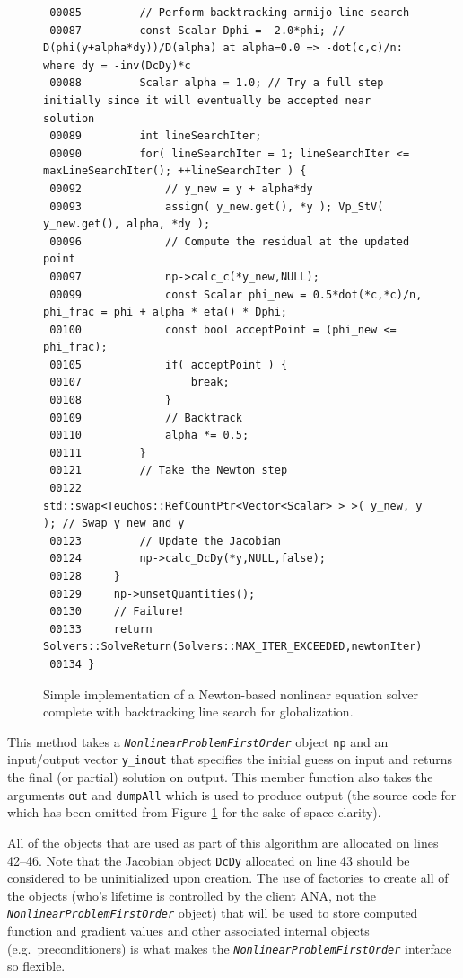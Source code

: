 {\begin{figure}
\begin{minipage}{\textwidth}
{\begin{verbatim}
 00085         // Perform backtracking armijo line search
 00087         const Scalar Dphi = -2.0*phi; // D(phi(y+alpha*dy))/D(alpha) at alpha=0.0 => -dot(c,c)/n: where dy = -inv(DcDy)*c
 00088         Scalar alpha = 1.0; // Try a full step initially since it will eventually be accepted near solution
 00089         int lineSearchIter;
 00090         for( lineSearchIter = 1; lineSearchIter <= maxLineSearchIter(); ++lineSearchIter ) {
 00092             // y_new = y + alpha*dy
 00093             assign( y_new.get(), *y ); Vp_StV( y_new.get(), alpha, *dy );
 00096             // Compute the residual at the updated point
 00097             np->calc_c(*y_new,NULL);
 00099             const Scalar phi_new = 0.5*dot(*c,*c)/n, phi_frac = phi + alpha * eta() * Dphi;
 00100             const bool acceptPoint = (phi_new <= phi_frac);
 00105             if( acceptPoint ) {
 00107                 break;
 00108             }
 00109             // Backtrack
 00110             alpha *= 0.5;
 00111         }
 00121         // Take the Newton step
 00122         std::swap<Teuchos::RefCountPtr<Vector<Scalar> > >( y_new, y ); // Swap y_new and y
 00123         // Update the Jacobian
 00124         np->calc_DcDy(*y,NULL,false);
 00128     }
 00129     np->unsetQuantities();
 00130     // Failure!
 00133     return Solvers::SolveReturn(Solvers::MAX_ITER_EXCEEDED,newtonIter);
 00134 }
\end{verbatim}}
\end{minipage}
\caption{
\label{tsfcore:nonlin:fig:newton_solver_code}
Simple implementation of a Newton-based nonlinear equation solver complete with
backtracking line search for globalization.
}
\end{figure}
\esinglespace}
%
This method takes a \texttt{\textit{Nonlinear\-Problem\-First\-Order}}
object \texttt{np} and an input/output vector \texttt{y\_inout} that
specifies the initial guess on input and returns the final (or
partial) solution on output.  This member function also takes the
arguments \texttt{out} and \texttt{dumpAll} which is used to produce
output (the source code for which has been omitted from Figure
\ref{tsfcore:nonlin:fig:newton_solver_code} for the sake of
space clarity).

All of the objects that are used as part of this algorithm are
allocated on lines 42--46.  Note that the Jacobian object
\texttt{DcDy} allocated on line 43 should be considered to be
uninitialized upon creation.  The use of factories to create all of
the objects (who's lifetime is controlled by the client ANA, not the
\texttt{\textit{Nonlinear\-Problem\-First\-Order}} object) that will
be used to store computed function and gradient values and other
associated internal objects (e.g.~preconditioners) is what makes the
\texttt{\textit{Nonlinear\-Problem\-First\-Order}} interface so
flexible.

